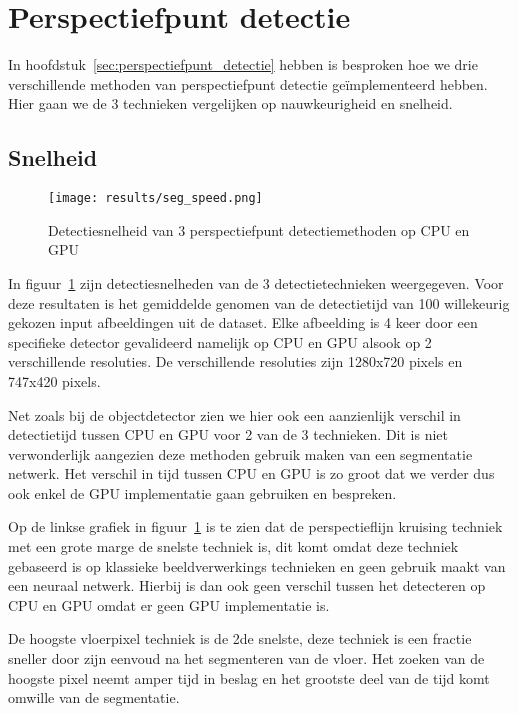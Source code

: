 \section{Perspectiefpunt detectie}

In hoofdstuk~\ref{sec:perspectiefpunt_detectie} hebben is besproken hoe we drie verschillende methoden van perspectiefpunt detectie ge\"{i}mplementeerd hebben.
Hier gaan we de 3 technieken vergelijken op nauwkeurigheid en snelheid.


\subsection{Snelheid}\label{sec:seg_speed}
\begin{figure}[h]
    \texttt{[image: results/seg\_speed.png]}
    \caption{Detectiesnelheid van 3 perspectiefpunt detectiemethoden op CPU en GPU}
    \label{fig:seg_speed}
\end{figure}

In figuur~\ref{fig:seg_speed} zijn detectiesnelheden van de 3 detectietechnieken weergegeven.
Voor deze resultaten is het gemiddelde genomen van de detectietijd van 100 willekeurig gekozen input afbeeldingen uit de dataset.
Elke afbeelding is 4 keer door een specifieke detector gevalideerd namelijk op \gls{CPU} en \gls{GPU} alsook op 2 verschillende resoluties.
De verschillende resoluties zijn 1280x720 pixels en 747x420 pixels.

Net zoals bij de objectdetector zien we hier ook een aanzienlijk verschil in detectietijd tussen \gls{CPU} en \gls{GPU} voor 2 van de 3 technieken.
Dit is niet verwonderlijk aangezien deze methoden gebruik maken van een segmentatie netwerk.
Het verschil in tijd tussen \gls{CPU} en \gls{GPU} is zo groot dat we verder dus ook enkel de \gls{GPU} implementatie gaan gebruiken en bespreken.

Op de linkse grafiek in figuur~\ref{fig:seg_speed} is te zien dat de perspectieflijn kruising techniek met een grote marge de snelste techniek is, dit komt
omdat deze techniek gebaseerd is op klassieke beeldverwerkings technieken en geen gebruik maakt van een neuraal netwerk.
Hierbij is dan ook geen verschil tussen het detecteren op \gls{CPU} en \gls{GPU} omdat er geen \gls{GPU} implementatie is.

De hoogste vloerpixel techniek is de 2de snelste, deze techniek is een fractie sneller door zijn eenvoud na het segmenteren van de vloer.
Het zoeken van de hoogste pixel neemt amper tijd in beslag en het grootste deel van de tijd komt omwille van de segmentatie.

